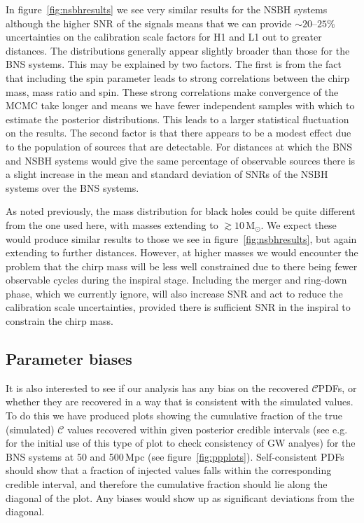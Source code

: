\documentclass[prd, twocolumn, lengthcheck, superscriptaddress, showpacs, letterpaper, nofootinbib]{revtex4-1}
\newcommand{\scf}{\ensuremath{\mathcal{C}}}
\newcommand{\scft}{\scf\xspace}
\begin{document}
In figure~\ref{fig:nsbhresults} we see very similar results for the \ac{NSBH}
systems although the higher \ac{SNR} of the signals means that we can provide
$\sim 20\mbox{--}25\%$ uncertainties on the calibration scale factors for H1
and L1 out to greater distances. The distributions generally appear slightly
broader than those for the \ac{BNS} systems. This may be explained
by two factors. The first is from the fact that including the spin
parameter leads to strong correlations between the chirp mass, mass ratio and
spin. These strong correlations make convergence of the \ac{MCMC} take longer
and means we have fewer independent samples with which to estimate the posterior
distributions. This leads to a larger statistical fluctuation on the
results.  The second factor is that there appears to be a modest effect due to
the population of sources that are detectable. For distances at which the
\ac{BNS} and \ac{NSBH} systems would give the same percentage of observable
sources there is a slight increase in the mean and standard deviation of
\acp{SNR} of the \ac{NSBH} systems over the \ac{BNS} systems.

As noted previously, the mass distribution for black holes could be quite
different from the one used here, with masses extending to $\gtrsim
10$\,M$_{\odot}$. We expect these would produce similar results to those we see
in figure~\ref{fig:nsbhresults}, but again extending to further distances. However, at higher 
masses we would encounter the problem that the chirp mass will be less well constrained due to 
there being fewer observable cycles during the inspiral stage.
Including the merger and ring-down phase, which we currently ignore, will also
increase \ac{SNR} and act to reduce the calibration scale uncertainties, provided there is
sufficient \ac{SNR} in the inspiral to constrain the chirp mass.


\subsection{Parameter biases}

It is also interested to see if our analysis has any bias on the recovered \scft \acp{PDF}, or whether they
are recovered in a way that is consistent with the simulated values.
To do this we have produced plots showing the cumulative fraction of the true (simulated)
\scft values recovered within given posterior credible intervals (see e.g.\ \cite{2014PhRvD..89h4060S} for the initial use
of this type of plot to check consistency of \ac{GW} analyes)
for the \ac{BNS} systems at 50 and 500\,Mpc (see figure~\ref{fig:ppplots}).
Self-consistent \acp{PDF} should show that a fraction of injected values falls within the corresponding credible interval,
and therefore the cumulative fraction should lie along the diagonal of the plot. Any
biases would show up as significant deviations from the diagonal.
\end{document}
